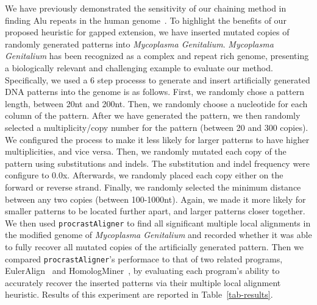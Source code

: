\documentclass[twoside,11pt]{article}
\begin{document}
We have previously demonstrated the sensitivity of our chaining method in finding Alu repeats in
the human genome~\cite{ref-procrast}. To highlight the benefits of our proposed heuristic for gapped extension, we have inserted mutated copies of randomly generated patterns into \emph{Mycoplasma Genitalium}. \emph{Mycoplasma Genitalium} has been recognized as a complex and repeat rich genome, presenting a biologically relevant and challenging example to evaluate our method. Specifically, we used a 6 step processs to generate and insert artificially generated DNA patterns into the genome is as follows. First, we randomly chose a pattern length, between 20nt and 200nt. Then, we randomly choose a nucleotide for each column of the pattern. After we have generated the pattern, we then randomly selected a multiplicity/copy number for the pattern (between 20 and 300 copies). We configured the process to make it less likely for larger patterns to have higher multiplicities, and vice versa. Then, we randomly mutated each copy of the pattern using substitutions and indels. The substitution and indel frequency were configure to 0.0x. Afterwards, we randomly placed each copy either on the forward or reverse strand. Finally, we randomly selected the minimum distance between any two copies (between 100-1000nt). Again, we made it more likely for smaller patterns to be located further apart, and larger patterns closer together. We then used \texttt{procrastAligner} to find all significant multiple local alignments in the modified genome of \emph{Mycoplasma Genitalium} and recorded whether it was able to fully recover all mutated copies of the  artificially generated pattern. Then we compared \texttt{procrastAligner}'s performace to that of two  related programs, EulerAlign~\cite{ref-related1} and HomologMiner~\cite{ref-homologminer}, by evaluating each program's ability to accurately recover the inserted patterns via their multiple local alignment heuristic. Results of this experiment are reported in Table~\ref{tab-results}.
\end{document}
